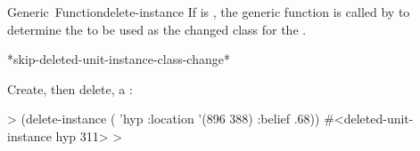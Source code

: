 \documentclass[10pt,twoside,english,pdftex]{article}
\begin{document}
\begin{functiondoc}{Generic~Function}{delete-instance}
\fndescription 
%
If  is
\nil, the generic function  is
called by  to determine the  to be
used as the changed class for the .

\begin{alsos}{*skip-deleted-unit-instance-class-change*}
\end{alsos}

\fnexample
{}%
Create, then delete, a  :
%
\W\supp
\begin{example}
  > (delete-instance ( 'hyp :location '(896 388) :belief .68))
  #<deleted-unit-instance hyp 311>
  >
\end{example}

\end{functiondoc}

\end{document}

